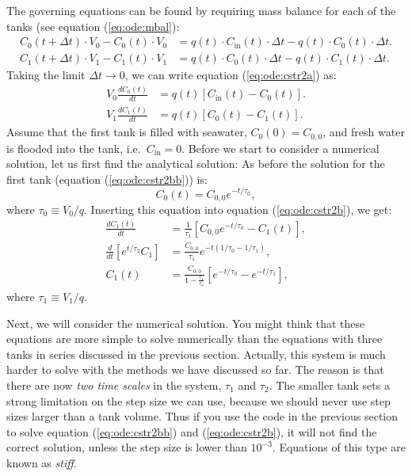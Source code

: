 \documentclass[graybox,sectrefs,envcountresetchap,open=right,final]{svmonodo}
\begin{document}
The governing equations can be found by requiring mass balance for each of the tanks (see equation (\ref{eq:ode:mbal}):
\begin{align}
C_0(t+\Delta t)\cdot V_0 - C_0(t)\cdot V_0 &= q(t)\cdot C_\text{in}(t)\cdot \Delta t - q(t)\cdot C_0(t)\cdot \Delta t.\nonumber\\ 
C_1(t+\Delta t)\cdot V_1 - C_1(t)\cdot V_1 &= q(t)\cdot C_0(t)\cdot \Delta t - q(t)\cdot C_1(t)\cdot \Delta t.
\label{eq:ode:cstr2a}
\end{align}
Taking the limit $\Delta t\to 0$, we can write equation (\ref{eq:ode:cstr2a}) as:
\begin{align}
V_0\frac{dC_0(t)}{dt} &= q(t)\left[C_\text{in}(t) - C_0(t)\right].\label{eq:ode:cstr2bb}\\ 
V_1\frac{dC_1(t)}{dt} &= q(t)\left[C_0(t) - C_1(t)\right].\label{eq:ode:cstr2b}
\end{align}
Assume that the first tank is filled with seawater, $C_0(0)=C_{0,0}$, and fresh water is flooded into the tank, i.e.~$C_\text{in}=0$. Before we start to consider a numerical
solution, let us first find the analytical solution: As before the solution for the first tank (equation (\ref{eq:ode:cstr2bb})) is:
\begin{equation}
C_0(t)=C_{0,0}e^{-t/\tau_0},
\end{equation}
where $\tau_0\equiv V_0/q$. Inserting this equation into equation (\ref{eq:ode:cstr2b}), we get:
\begin{align}
\frac{dC_1(t)}{dt} &= \frac{1}{\tau_1}\left[C_{0,0}e^{-t/\tau_0} - C_1(t)\right],\nonumber\\ 
\frac{d}{dt}\left[e^{t/\tau_2}C_1\right]&= \frac{C_{0,0}}{\tau_1}e^{-t(1/\tau_0-1/\tau_1)}\label{eq:ode:cstr2c},\\ 
C_1(t)&=\frac{C_{0,0}}{1-\frac{\tau_1}{\tau_0}}\left[e^{-t/\tau_0}-e^{-t/\tau_1}\right],\label{eq:ode:cstr2d}
\end{align}
where $\tau_1\equiv V_1/q$.

Next, we will consider the numerical solution. You might think that these equations are more simple to solve numerically than the equations with three tanks
in series discussed in the previous section. Actually, this system is much harder to solve with the methods we have discussed so far.
The reason is that there are now \emph{two time scales} in the system, $\tau_1$ and $\tau_2$. The smaller tank sets a strong limitation on the step size
we can use, because we should never use step sizes larger than a tank volume. Thus if you use the code in the previous section to solve equation
(\ref{eq:ode:cstr2bb}) and (\ref{eq:ode:cstr2b}), it will not find the correct solution, unless the step size is lower than $10^{-3}$. Equations of this type
are known as \emph{stiff}. 
\end{document}
